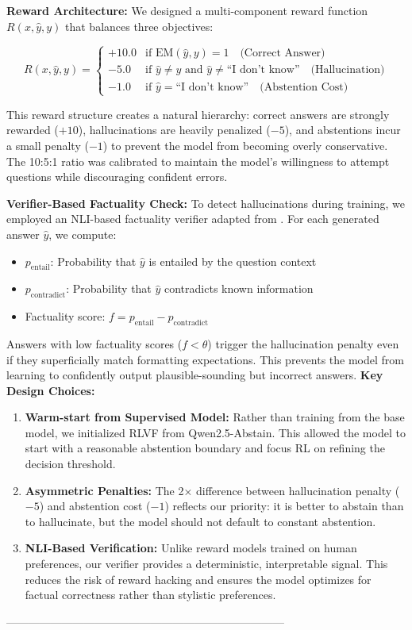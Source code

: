 \documentclass{article}
\begin{document}
\textbf{Reward Architecture:} We designed a multi-component reward function $R(x, \hat{y}, y)$ that balances three objectives:

\begin{equation}
R(x, \hat{y}, y) = \begin{cases}
+10.0 & \text{if } \text{EM}(\hat{y}, y) = 1 \quad \text{(Correct Answer)} \\
-5.0 & \text{if } \hat{y} \neq y \text{ and } \hat{y} \neq \text{``I don't know''} \quad \text{(Hallucination)} \\
-1.0 & \text{if } \hat{y} = \text{``I don't know''} \quad \text{(Abstention Cost)}
\end{cases}
\end{equation}

This reward structure creates a natural hierarchy: correct answers are strongly rewarded ($+10$), hallucinations are heavily penalized ($-5$), and abstentions incur a small penalty ($-1$) to prevent the model from becoming overly conservative. The 10:5:1 ratio was calibrated to maintain the model's willingness to attempt questions while discouraging confident errors.

\textbf{Verifier-Based Factuality Check:} To detect hallucinations during training, we employed an NLI-based factuality verifier adapted from \cite{factualityverifier}. For each generated answer $\hat{y}$, we compute:
\begin{itemize}
    \item $p_{\text{entail}}$: Probability that $\hat{y}$ is entailed by the question context
    \item $p_{\text{contradict}}$: Probability that $\hat{y}$ contradicts known information
    \item Factuality score: $f = p_{\text{entail}} - p_{\text{contradict}}$
\end{itemize}

Answers with low factuality scores ($f < \theta$) trigger the hallucination penalty even if they superficially match formatting expectations. This prevents the model from learning to confidently output plausible-sounding but incorrect answers.
\textbf{Key Design Choices:} 
\begin{enumerate}
    \item \textbf{Warm-start from Supervised Model:} Rather than training from the base model, we initialized RLVF from Qwen2.5-Abstain. This allowed the model to start with a reasonable abstention boundary and focus RL on refining the decision threshold.
    \item \textbf{Asymmetric Penalties:} The 2× difference between hallucination penalty ($-5$) and abstention cost ($-1$) reflects our priority: it is better to abstain than to hallucinate, but the model should not default to constant abstention.
    \item \textbf{NLI-Based Verification:} Unlike reward models trained on human preferences, our verifier provides a deterministic, interpretable signal. This reduces the risk of reward hacking and ensures the model optimizes for factual correctness rather than stylistic preferences.
\end{enumerate}
---------------------------------------------------------------------------
\end{document}

